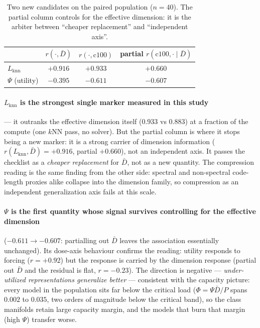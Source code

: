 \documentclass[10pt]{article}
\begin{document}
\begin{table}[t]
\centering
\caption{Two new candidates on the paired population ($n=40$). The partial
column controls for the effective dimension: it is the arbiter between
``cheaper replacement'' and ``independent axis''.}
\label{tab:nextmarker}
\small
\begin{tabular}{lccc}
\toprule
 & $r(\cdot,\bar D)$ & $r(\cdot,\mathrm{c100})$ & partial $r(\mathrm{c100},\cdot \mid \bar D)$ \\
\midrule
$L_{\mathrm{knn}}$ & $+0.916$ & $\mathbf{+0.933}$ & $+0.660$ \\
$\Psi$ (utility)  & $-0.395$ & $-0.611$ & $\mathbf{-0.607}$ \\
\bottomrule
\end{tabular}
\end{table}

\paragraph{$L_{\mathrm{knn}}$ is the strongest single marker measured in this
study} --- it outranks the effective dimension itself ($0.933$ vs $0.883$) at
a fraction of the compute (one $k$NN pass, no solver). But the partial column
is where it stops being a new marker: it is a strong carrier of dimension
information ($r(L_{\mathrm{knn}}, \bar D) = +0.916$, partial $+0.660$), not
an independent axis. It passes the checklist as a \emph{cheaper replacement}
for $\bar D$, not as a new quantity. The compression reading is the same
finding from the other side: spectral and non-spectral code-length proxies
alike collapse into the dimension family, so compression as an independent
generalization axis fails at this scale.

\paragraph{$\Psi$ is the first quantity whose signal survives controlling for
the effective dimension} ($-0.611 \to -0.607$: partialling out $\bar D$ leaves
the association essentially unchanged). Its dose-axis behaviour confirms the
reading: utility responds to forcing ($r = +0.92$) but the response is
carried by the dimension response (partial out $\bar D$ and the residual is
flat, $r = -0.23$). The direction is negative ---
\emph{under-utilized representations generalize better} --- consistent with
the capacity picture: every model in the population sits far below the
critical load ($\Phi = \Psi \bar D / P$ spans $0.002$ to $0.035$, two orders
of magnitude below the critical band), so the class manifolds retain large
capacity margin, and the models that burn that margin (high $\Psi$) transfer
worse.
\end{document}
